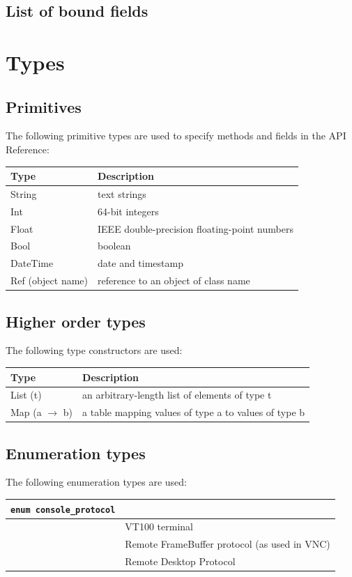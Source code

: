 \subsection{List of bound fields}
\section{Types}
\subsection{Primitives}
The following primitive types are used to specify methods and fields in the API Reference:

\begin{center}\begin{tabular}{|ll|}
\hline
Type & Description \\
\hline
String & text strings \\
Int    & 64-bit integers \\
Float & IEEE double-precision floating-point numbers \\
Bool   & boolean \\
DateTime & date and timestamp \\
Ref (object name) & reference to an object of class name \\
\hline
\end{tabular}\end{center}
\subsection{Higher order types}
The following type constructors are used:

\begin{center}\begin{tabular}{|ll|}
\hline
Type & Description \\
\hline
List (t) & an arbitrary-length list of elements of type t \\
Map (a $\rightarrow$ b) & a table mapping values of type a to values of type b \\
\hline
\end{tabular}\end{center}
\subsection{Enumeration types}
The following enumeration types are used:

\begin{longtable}{|ll|}
\hline
{\tt enum console\_protocol} & \\
\hline
\hspace{0.5cm}{\tt vt100} & VT100 terminal \\
\hspace{0.5cm}{\tt rfb} & Remote FrameBuffer protocol (as used in VNC) \\
\hspace{0.5cm}{\tt rdp} & Remote Desktop Protocol \\
\hline
\end{longtable}

